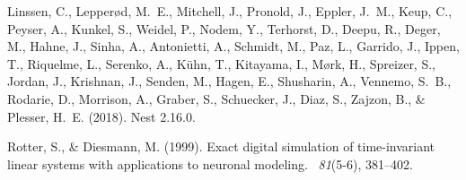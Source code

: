 \documentclass[10pt,a4paper,twoside,american]{article}
\begin{document}
\begin{thebibliography}{}

Linssen, C., Lepper{\o}d, M.~E., Mitchell, J., Pronold, J., Eppler, J.~M.,
  Keup, C., Peyser, A., Kunkel, S., Weidel, P., Nodem, Y., Terhorst, D., Deepu,
  R., Deger, M., Hahne, J., Sinha, A., Antonietti, A., Schmidt, M., Paz, L.,
  Garrido, J., Ippen, T., Riquelme, L., Serenko, A., K\"{u}hn, T., Kitayama,
  I., M{\o}rk, H., Spreizer, S., Jordan, J., Krishnan, J., Senden, M., Hagen,
  E., Shusharin, A., Vennemo, S.~B., Rodarie, D., Morrison, A., Graber, S.,
  Schuecker, J., Diaz, S., Zajzon, B., \& Plesser, H.~E. (2018).
\newblock Nest 2.16.0.

Rotter, S., \& Diesmann, M. (1999).
\newblock Exact digital simulation of time-invariant linear systems with
  applications to neuronal modeling.
~{\em 81\/}(5-6), 381--402.

\end{thebibliography}
\end{document}
